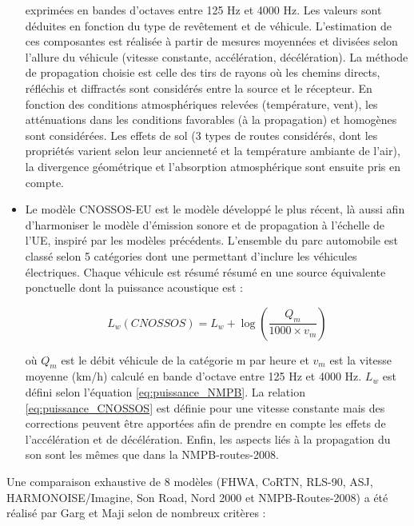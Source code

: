 \begin{itemize}
exprimées en bandes d'octaves entre 125 Hz et 4000 Hz. Les valeurs sont déduites en fonction du type de revêtement et de véhicule. L'estimation de ces composantes est réalisée à partir de mesures moyennées et divisées selon l'allure du véhicule (vitesse constante, accélération, décélération). La méthode de propagation choisie est celle des tirs de rayons où les chemins directs, réfléchis et diffractés sont considérés entre la source et le récepteur. En fonction des conditions atmosphériques relevées (température, vent), les atténuations dans les conditions favorables (à la propagation) et homogènes sont considérées. Les effets de sol (3 types de routes considérés, dont les propriétés varient selon leur ancienneté et la température ambiante de l'air), la divergence géométrique et l'absorption atmosphérique sont ensuite pris en compte.

\item Le modèle CNOSSOS-EU \cite{CNOSSOS} est le modèle développé le plus récent, là aussi afin d'harmoniser le modèle d'émission sonore et de propagation à l'échelle de l'UE, inspiré par les modèles précédents. L'ensemble du parc automobile est classé selon 5 catégories  dont une permettant d'inclure les véhicules électriques. Chaque véhicule est résumé résumé en une source équivalente ponctuelle dont la puissance acoustique est :  
 
\begin{equation}\label{eq:puissance_CNOSSOS}
L_w(CNOSSOS) = L_w + \log\left(\frac{Q_m}{1000\times v_m} \right)
\end{equation}

où $Q_m$ est le débit véhicule de la catégorie m par heure et $v_m$ est la vitesse moyenne (km/h) calculé en bande d'octave entre 125 Hz et 4000 Hz. $L_w$ est défini selon l'équation \ref{eq:puissance_NMPB}. La relation \ref{eq:puissance_CNOSSOS} est définie pour une vitesse constante mais des corrections peuvent être apportées afin de prendre en compte les effets de l'accélération et de décélération. Enfin, les aspects liés à la propagation du son sont les mêmes que dans la NMPB-routes-2008. 
\end{itemize}

Une comparaison exhaustive de 8 modèles (FHWA, CoRTN, RLS-90, ASJ, HARMONOISE/Imagine, Son Road, Nord 2000 et NMPB-Routes-2008) a été réalisé par Garg et Maji \cite{garg_critical_2014} selon de nombreux critères :

